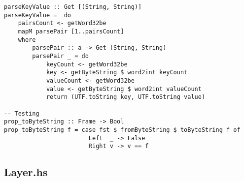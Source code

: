 \documentclass[russian,utf8,simple,emptystyle]{eskdtext}
\begin{document}
\begin{lstlisting}
parseKeyValue :: Get [(String, String)]
parseKeyValue =  do
    pairsCount <- getWord32be
    mapM parsePair [1..pairsCount]
    where
        parsePair :: a -> Get (String, String)
        parsePair _ = do
            keyCount <- getWord32be
            key <- getByteString $ word2int keyCount
            valueCount <- getWord32be
            value <- getByteString $ word2int valueCount
            return (UTF.toString key, UTF.toString value)

-- Testing 
prop_toByteString :: Frame -> Bool
prop_toByteString f = case fst $ fromByteString $ toByteString f of 
                        Left  _ -> False
                        Right v -> v == f
\end{lstlisting}

\subsection{Layer.hs}
\end{document}
